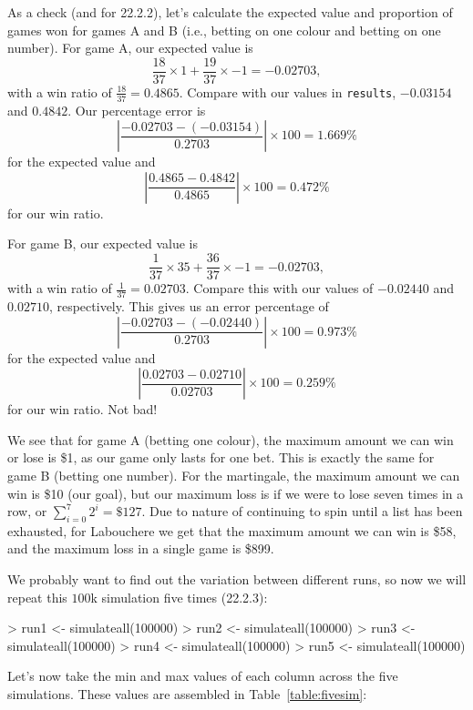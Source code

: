 \documentclass[9pt, oneside, reqno]{article}
\theoremstyle{plain}
\begin{document}
As a check (and for 22.2.2), let's calculate the expected value and proportion of games won for games A and B (i.e., betting on one colour and betting on one number). For game A, our expected value is 
\[\frac{18}{37} \times 1 + \frac{19}{37} \times - 1 = -0.02703,\] 
with a win ratio of $\frac{18}{37}=0.4865$.  Compare with our values in {\tt results}, $-0.03154$ and $0.4842$. Our percentage error is 
\[\left | \frac{-0.02703 - (-0.03154)}{0.2703}\right | \times 100 = 1.669\%\] for the expected value and 
\[\left| \frac{0.4865-0.4842}{0.4865}\right| \times 100 = 0.472\%\] for our win ratio. 

For game B, our expected value is 
\[\frac{1}{37} \times 35 + \frac{36}{37} \times -1 = -0.02703,\] 
with a win ratio of $\frac{1}{37}=0.02703$. Compare this with our values of $-0.02440$ and $0.02710$, respectively. This gives us an error percentage of 
\[\left | \frac{-0.02703 - (-0.02440)}{0.2703}\right | \times 100 = 0.973\%\] 
for the expected value and 
\[\left| \frac{0.02703-0.02710}{0.02703}\right| \times 100 = 0.259\%\] for our win ratio. Not bad!

We see that for game A (betting one colour), the maximum amount we can win or lose is \$1, as our game only lasts for one bet. This is exactly the same for game B (betting one number). For the martingale, the maximum amount we can win is \$10 (our goal), but our maximum loss is if we were to lose seven times in a row, or $\sum^7_{i=0} 2^i = \$127$. Due to nature of continuing to spin until a list has been exhausted, for Labouchere we get that the maximum amount we can win is \$58, and the maximum loss in a single game is \$899.

We probably want to find out the variation between different runs, so now we will repeat this $100$k simulation five times (22.2.3):

\begin{Schunk}
\begin{Sinput}
> run1 <- simulateall(100000)
> run2 <- simulateall(100000)
> run3 <- simulateall(100000)
> run4 <- simulateall(100000)
> run5 <- simulateall(100000)
\end{Sinput}
\end{Schunk}


Let's now take the min and max values of each column across the five simulations. These values are assembled in Table~\ref{table:fivesim}:
\end{document}
